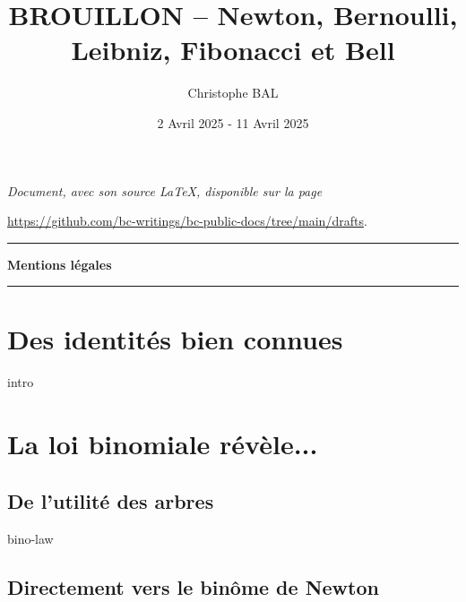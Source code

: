 \documentclass[12pt]{amsart}
\begin{document}
\title{BROUILLON -- Newton, Bernoulli, Leibniz, Fibonacci et Bell}
\author{Christophe BAL}
\date{2 Avril 2025 - 11 Avril 2025}

\maketitle

\begin{center}
	\itshape
	Document, avec son source \LaTeX, disponible sur la page

	\url{https://github.com/bc-writings/bc-public-docs/tree/main/drafts}.
\end{center}


\bigskip


\begin{center}
	\hrule\vspace{.3em}
	{
		\fontsize{1.35em}{1em}\selectfont
		\textbf{Mentions \og légales \fg}
	}

	\vspace{0.45em}
	\doclicenseThis
	\hrule
\end{center}


\bigskip


\setcounter{tocdepth}{2}
\tableofcontents




\newpage

\section{Des identités bien connues}

{intro}




\section{La loi binomiale révèle...}

    \subsection{De l'utilité des arbres}
    
    {bino-law}
    
    
    \subsection{Directement vers le binôme de Newton}
    
\end{document}
